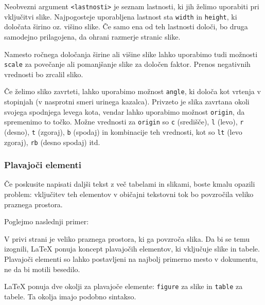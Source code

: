 Neobvezni argument \texttt{\textless lastnosti\textgreater } je seznam lastnosti, ki jih želimo uporabiti pri vključitvi slike.
Najpogosteje uporabljena lastnost sta \texttt{width} in \texttt{height}, ki določata širino oz. višino slike. Če samo ena od teh lastnosti določi, bo druga samodejno prilagojena, da ohrani razmerje stranic slike.

\begin{example}\label{eg-slike-includegraphics-widthheight}\end{example}Namesto ročnega določanja širine ali višine slike lahko uporabimo tudi možnosti \texttt{scale} za povečanje ali pomanjšanje slike za določen faktor.
Prenos negativnih vrednosti bo zrcalil sliko.

\begin{example}\label{eg-slike-includegraphics-scale}\end{example}Če želimo sliko zavrteti, lahko uporabimo možnost \texttt{angle}, ki določa kot vrtenja v stopinjah (v nasprotni smeri urinega kazalca).
Privzeto je slika zavrtana okoli svojega spodnjega levega kota, vendar lahko uporabimo možnost \texttt{origin}, da spremenimo to točko.
Možne vrednosti za \texttt{origin} so \texttt{c} (središče), \texttt{l} (levo), \texttt{r} (desno), \texttt{t} (zgoraj), \texttt{b} (spodaj) in kombinacije teh vrednosti, kot so \texttt{lt} (levo zgoraj), \texttt{rb} (desno spodaj) itd.

\begin{example}\label{eg-slike-includegraphics-angle}\end{example}\subsubsection{Plavajoči elementi}

Če poskusite napisati daljši tekst z več tabelami in slikami, boste kmalu opazili problem: vključitev teh elementov v običajni tekstovni tok bo povzročila veliko praznega prostora.

Poglejmo naslednji primer:

\begin{example}\label{eg-floating-1}\end{example}V privi strani je veliko praznega prostora, ki ga povzroča slika.
Da bi se temu izognili, LaTeX ponuja koncept plavajočih elementov, ki vključuje slike in tabele.
Plavajoči elementi so lahko postavljeni na najbolj primerno mesto v dokumentu, ne da bi motili besedilo.

LaTeX ponuja dve okolji za plavajoče elemente: \texttt{figure} za slike in \texttt{table} za tabele.
Ta okolja imajo podobno sintakso.

